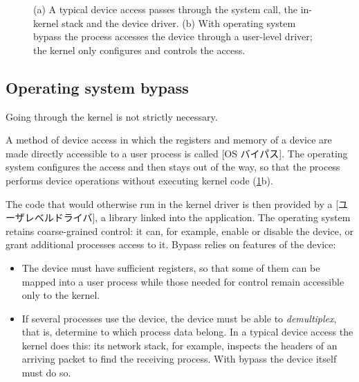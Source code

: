 \documentclass[../main.tex]{subfiles}
\begin{document}
\begin{figure}[htbp]
  \centering
  
  \caption{(a) A typical device access passes through the system call, the
    in-kernel stack and the device driver.  (b) With operating system bypass
    the process accesses the device through a user-level driver; the kernel
    only configures and controls the access.}
  \label{fig:l11-access}
\end{figure}

\subsection{Operating system bypass}

Going through the kernel is not strictly necessary.

\begin{definition}
  A method of device access in which the registers and memory of a device
  are made directly accessible to a user process is called
  [OS バイパス].  The operating system
  configures the access and then stays out of the way, so that the process
  performs device operations without executing kernel code
  (\cref{fig:l11-access}b).
\end{definition}

The code that would otherwise run in the kernel driver is then provided by a
[ユーザレベルドライバ], a library linked into the
application.  The operating system retains coarse-grained
control: it can, for example, enable or disable the device, or grant
additional processes access to it.
Bypass relies on features of the device:
\begin{itemize}
  \item The device must have sufficient registers, so that some of them can
    be mapped into a user process while those needed for control remain
    accessible only to the kernel.
  \item If several processes use the device, the device must be able to
    \emph{demultiplex}, that is, determine to which process data
    belong.  In a typical
    device access the kernel does this: its network stack, for example,
    inspects the headers of an arriving packet to find the receiving
    process.  With bypass the device itself must do so.
\end{itemize}
\end{document}

